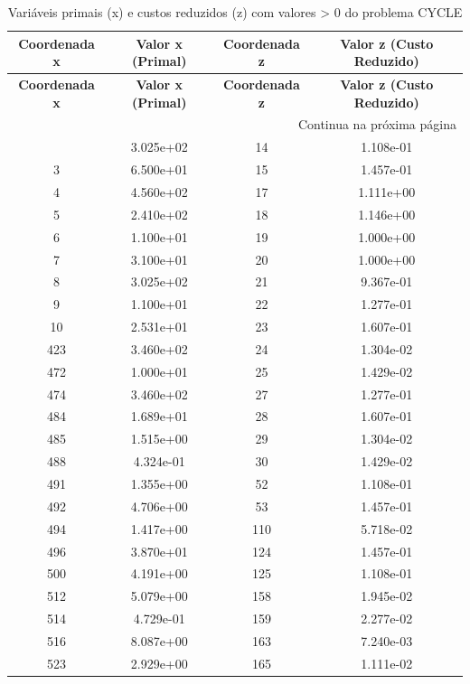 \documentclass[12pt]{article}
\begin{document}
\begin{longtable}{@{}cccc@{}}
\caption{Variáveis primais (x) e custos reduzidos (z) com valores > 0 do problema CYCLE} \\
\toprule
\textbf{Coordenada x} & \textbf{Valor x (Primal)} & \textbf{Coordenada z} & \textbf{Valor z (Custo Reduzido)} \\
\midrule
\endfirsthead

\toprule
\textbf{Coordenada x} & \textbf{Valor x (Primal)} & \textbf{Coordenada z} & \textbf{Valor z (Custo Reduzido)} \\
\midrule
\endhead

\midrule \multicolumn{4}{r}{{Continua na próxima página}} \\ \midrule
\endfoot

\bottomrule
\endlastfoot
1 & 3.025e+02 & 14 & 1.108e-01 \\
3 & 6.500e+01 & 15 & 1.457e-01 \\
4 & 4.560e+02 & 17 & 1.111e+00 \\
5 & 2.410e+02 & 18 & 1.146e+00 \\
6 & 1.100e+01 & 19 & 1.000e+00 \\
7 & 3.100e+01 & 20 & 1.000e+00 \\
8 & 3.025e+02 & 21 & 9.367e-01 \\
9 & 1.100e+01 & 22 & 1.277e-01 \\
10 & 2.531e+01 & 23 & 1.607e-01 \\
423 & 3.460e+02 & 24 & 1.304e-02 \\
472 & 1.000e+01 & 25 & 1.429e-02 \\
474 & 3.460e+02 & 27 & 1.277e-01 \\
484 & 1.689e+01 & 28 & 1.607e-01 \\
485 & 1.515e+00 & 29 & 1.304e-02 \\
488 & 4.324e-01 & 30 & 1.429e-02 \\
491 & 1.355e+00 & 52 & 1.108e-01 \\
492 & 4.706e+00 & 53 & 1.457e-01 \\
494 & 1.417e+00 & 110 & 5.718e-02 \\
496 & 3.870e+01 & 124 & 1.457e-01 \\
500 & 4.191e+00 & 125 & 1.108e-01 \\
512 & 5.079e+00 & 158 & 1.945e-02 \\
514 & 4.729e-01 & 159 & 2.277e-02 \\
516 & 8.087e+00 & 163 & 7.240e-03 \\
523 & 2.929e+00 & 165 & 1.111e-02 \\

\end{longtable}
\end{document}

